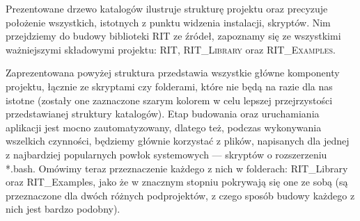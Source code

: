 Prezentowane drzewo katalogów ilustruje strukturę projektu oraz precyzuje położenie wszystkich, istotnych z punktu widzenia instalacji, skryptów. Nim przejdziemy do budowy biblioteki \textsc{RIT} ze źródeł, zapoznamy się ze wszystkimi ważniejszymi składowymi projektu: \textsc{RIT}, \textsc{RIT\_Library} oraz \textsc{RIT\_Examples}.

\small
\noindent{}

Zaprezentowana powyżej struktura przedstawia wszystkie główne komponenty projektu, łącznie ze skryptami czy folderami, które nie będą na razie dla nas istotne (zostały one zaznaczone szarym kolorem w celu lepszej przejrzystości przedstawianej struktury katalogów). Etap budowania oraz uruchamiania aplikacji jest mocno zautomatyzowany, dlatego też, podczas wykonywania wszelkich czynności, będziemy głównie korzystać z plików, napisanych dla jednej z najbardziej popularnych powłok systemowych --- skryptów o rozszerzeniu \textsf{*.bash}. Omówimy teraz przeznaczenie każdego z nich w folderach: \textsf{RIT\_Library} oraz  \textsf{RIT\_Examples}, jako że w znacznym stopniu pokrywają się one ze sobą (są przeznaczone dla dwóch różnych podprojektów, z czego sposób budowy każdego z nich jest bardzo podobny).

